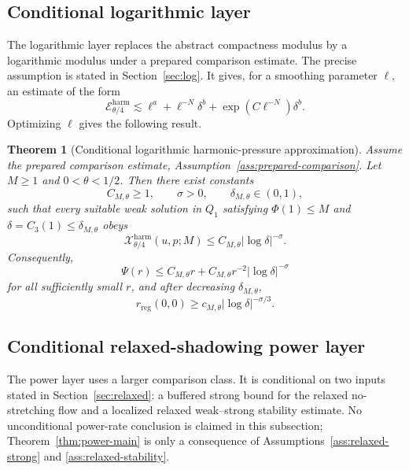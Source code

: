 \documentclass[pdflatex,sn-mathphys-num]{sn-jnl}
\numberwithin{equation}{section}
\theoremstyle{thmstyleone}
\newtheorem{theorem}{Theorem}[section]
\theoremstyle{thmstylethree}
\newcommand{\reg}{\mathrm{reg}}
\newcommand{\calE}{\mathcal E}
\newcommand{\calX}{\mathcal X}
\newcommand{\harm}{\mathrm{harm}}
\begin{document}
\subsection{Conditional logarithmic layer}

The logarithmic layer replaces the abstract compactness modulus by a logarithmic modulus under a prepared comparison estimate.  The precise assumption is stated in Section~\ref{sec:log}.  It gives, for a smoothing parameter \(\ell\), an estimate of the form
\[
        \calE^{\harm}_{\theta/4}
        \lesssim
        \ell^a+\ell^{-N}\delta^b+\exp(C\ell^{-N})\delta^b.
\]
Optimizing \(\ell\) gives the following result.

\begin{theorem}[Conditional logarithmic harmonic-pressure approximation]
\label{thm:log-main}
Assume the prepared comparison estimate, Assumption~\ref{ass:prepared-comparison}.  Let \(M\ge1\) and \(0<\theta<1/2\).  Then there exist constants
\[
        C_{M,\theta}\ge1,
        \qquad
        \sigma>0,
        \qquad
        \delta_{M,\theta}\in(0,1),
\]
such that every suitable weak solution in \(Q_1\) satisfying \(\Phi(1)\le M\) and \(\delta=C_3(1)\le\delta_{M,\theta}\) obeys
\begin{equation}
        \calX^{\harm}_{\theta/4}(u,p;M)
        \le C_{M,\theta}|\log\delta|^{-\sigma}.
        \label{eq:log-main-excess}
\end{equation}
Consequently,
\begin{equation}
        \Psi(r)
        \le C_{M,\theta}r+C_{M,\theta}r^{-2}|\log\delta|^{-\sigma}
        \label{eq:log-decay-main}
\end{equation}
for all sufficiently small \(r\), and after decreasing \(\delta_{M,\theta}\),
\begin{equation}
        r_{\reg}(0,0)
        \ge c_{M,\theta}|\log\delta|^{-\sigma/3}.
        \label{eq:log-radius-main}
\end{equation}
\end{theorem}

\subsection{Conditional relaxed-shadowing power layer}

The power layer uses a larger comparison class.  It is conditional on two inputs stated in Section~\ref{sec:relaxed}: a buffered strong bound for the relaxed no-stretching flow and a localized relaxed weak--strong stability estimate.  No unconditional power-rate conclusion is claimed in this subsection; Theorem~\ref{thm:power-main} is only a consequence of Assumptions~\ref{ass:relaxed-strong} and \ref{ass:relaxed-stability}.
\end{document}
